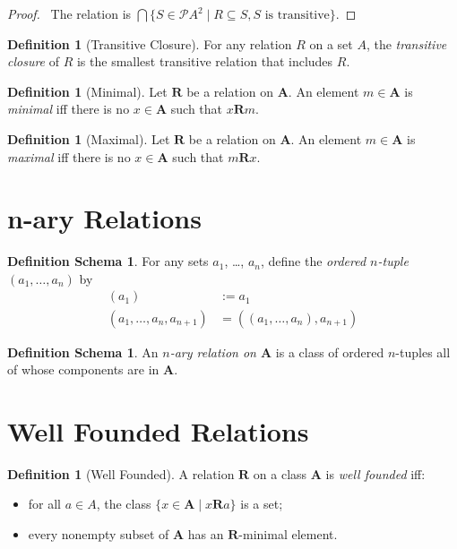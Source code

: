 \documentclass{book}
\let\qed\relax
\theoremstyle{definition}
\newtheorem{df}[ax]{Definition}
\newtheorem{dfs}[ax]{Definition Schema}
\begin{document}
\begin{proof}
\pf\ The relation is $\bigcap \{ S \in \mathcal{P} A^2 \mid R \subseteq S, S \text{ is transitive} \}$. \qed
\end{proof}

\begin{df}[Transitive Closure]
For any relation $R$ on a set $A$, the \emph{transitive closure} of $R$ is the smallest transitive relation that includes $R$.
\end{df}

\begin{df}[Minimal]
Let $\mathbf{R}$ be a relation on $\mathbf{A}$. An element $m \in \mathbf{A}$ is \emph{minimal} iff there is no $x \in \mathbf{A}$ such that $x \mathbf{R} m$.
\end{df}

\begin{df}[Maximal]
Let $\mathbf{R}$ be a relation on $\mathbf{A}$. An element $m \in \mathbf{A}$ is \emph{maximal} iff there is no $x \in \mathbf{A}$ such that $m \mathbf{R} x$.
\end{df}

\section{n-ary Relations}

\begin{dfs}
For any sets $a_1$, \ldots, $a_n$, define the \emph{ordered $n$-tuple} $(a_1, \ldots, a_n)$ by
\begin{align*}
(a_1) & := a_1 \\
(a_1, \ldots, a_n, a_{n+1}) & = ((a_1, \ldots, a_n), a_{n+1})
\end{align*}
\end{dfs}

\begin{dfs}
An \emph{$n$-ary relation on $\mathbf{A}$} is a class of ordered $n$-tuples all of whose components are in $\mathbf{A}$.
\end{dfs}

\section{Well Founded Relations}

\begin{df}[Well Founded]
A relation $\mathbf{R}$ on a class $\mathbf{A}$ is \emph{well founded} iff:
\begin{itemize}
\item for all $a \in A$, the class $\{ x \in \mathbf{A} \mid x \mathbf{R} a \}$ is a set;
\item every nonempty subset of $\mathbf{A}$ has an $\mathbf{R}$-minimal element.
\end{itemize}
\end{df}
\end{document}
